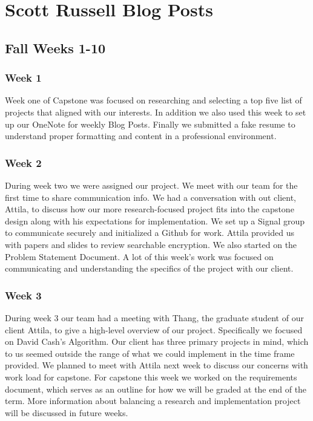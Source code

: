 \clearpage

\section{ Scott Russell Blog Posts}

\subsection{Fall Weeks 1-10}

\subsubsection{Week 1}
Week one of Capstone was focused on researching and selecting a top five list of projects that aligned with our interests. In addition we also used this week to set up our OneNote for weekly Blog Posts. Finally we submitted a fake resume to understand proper formatting and content in a professional environment.

\subsubsection{Week 2}
During week two we were assigned our project. We meet with our team for the first time to share communication info. We had a conversation with out client, Attila, to discuss how our more research-focused project fits into the capstone design along with his expectations for implementation. We set up a Signal group to communicate securely and initialized a Github for work. Attila provided us with papers and slides to review searchable encryption. We also started on the Problem Statement Document. A lot of this week's work was focused on communicating and understanding the specifics of the project with our client.

\subsubsection{Week 3}
During week 3 our team had a meeting with Thang, the graduate student of our client Attila, to give a high-level overview of our project. Specifically we focused on David Cash's Algorithm. Our client has three primary projects in mind, which to us seemed outside the range of what we could implement in the time frame provided. We planned to meet with Attila next week to discuss our concerns with work load for capstone. For capstone this week we worked on the requirements document, which serves as an outline for how we will be graded at the end of the term. More information about balancing a research and implementation project will be discussed in future weeks.


